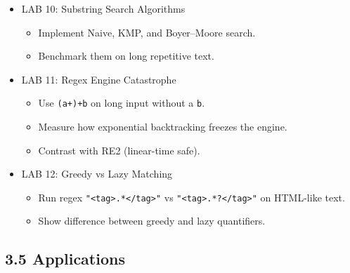 \documentclass[
  letterpaper,
  DIV=11,
  numbers=noendperiod]{scrreprt}
\providecommand{\tightlist}{%
  \setlength{\itemsep}{0pt}\setlength{\parskip}{0pt}}
\begin{document}
\begin{itemize}
\item
  LAB 10: Substring Search Algorithms

  \begin{itemize}
  \tightlist
  \item
    Implement Naive, KMP, and Boyer--Moore search.
  \item
    Benchmark them on long repetitive text.
  \end{itemize}
\item
  LAB 11: Regex Engine Catastrophe

  \begin{itemize}
  \tightlist
  \item
    Use \texttt{(a+)+b} on long input without a \texttt{b}.
  \item
    Measure how exponential backtracking freezes the engine.
  \item
    Contrast with RE2 (linear-time safe).
  \end{itemize}
\item
  LAB 12: Greedy vs Lazy Matching

  \begin{itemize}
  \tightlist
  \item
    Run regex
    \texttt{"\textless{}tag\textgreater{}.*\textless{}/tag\textgreater{}"}
    vs
    \texttt{"\textless{}tag\textgreater{}.*?\textless{}/tag\textgreater{}"}
    on HTML-like text.
  \item
    Show difference between greedy and lazy quantifiers.
  \end{itemize}
\end{itemize}

\subsection{3.5 Applications}\label{applications-2}
\end{document}

